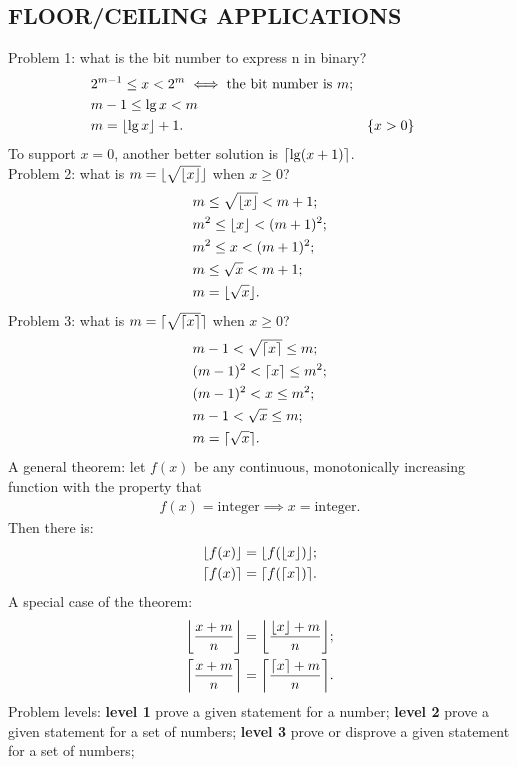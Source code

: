 \documentclass{article}
\DeclarePairedDelimiter\ceil{\lceil}{\rceil}
\DeclarePairedDelimiter\floor{\lfloor}{\rfloor}
\begin{document}
\subsection{FLOOR/CEILING APPLICATIONS}
Problem 1: what is the bit number to express n in binary?
\begin{align}
&2^{m-1} \le x < 2^m \iff \text{the bit number is }m; \\
&m-1 \le \lg{x} < m \\
&m = \floor{\lg{x}} + 1. && \{x > 0\}
\end{align}
To support $x=0$, another better solution is $\ceil{\lg(x+1)}$.\\
Problem 2: what is $m = \floor{\sqrt{\floor{x}}}$ when $x \ge 0$?
\begin{align}
&m \le \sqrt{\floor{x}} < m + 1; \\
&m^2 \le \floor{x} < (m+1)^2; \\
&m^2 \le x < (m+1)^2; \\
&m \le \sqrt{x} < m + 1; \\
&m = \floor{\sqrt{x}}.
\end{align}
Problem 3: what is $m = \ceil{\sqrt{\ceil{x}}}$ when $x \ge 0$?
\begin{align}
&m - 1 < \sqrt{\ceil{x}} \le m; \\
&(m-1)^2 < \ceil{x} \le m^2; \\
&(m-1)^2 < x \le m^2; \\
&m-1 < \sqrt{x} \le m; \\
&m = \ceil{\sqrt{x}}.
\end{align}
A general theorem: let $f(x)$ be any continuous, monotonically increasing function with the property that
\begin{align}
f(x) = \text{integer} \implies x = \text{integer}.
\end{align}
Then there is:
\begin{align}
\floor{f(x)} = \floor{f(\floor{x})};\\
\ceil{f(x)} = \ceil{f(\ceil{x})}.
\end{align}
A special case of the theorem:
\begin{align}
\floor*{\frac{x+m}{n}} = \floor*{\frac{\floor{x}+m}{n}};\\
\ceil*{\frac{x+m}{n}} = \ceil*{\frac{\ceil{x}+m}{n}}.
\end{align}
Problem levels: 
\textbf{level 1} prove a given statement for a number;
\textbf{level 2} prove a given statement for a set of numbers;
\textbf{level 3} prove or disprove a given statement for a set of numbers;
\end{document}
